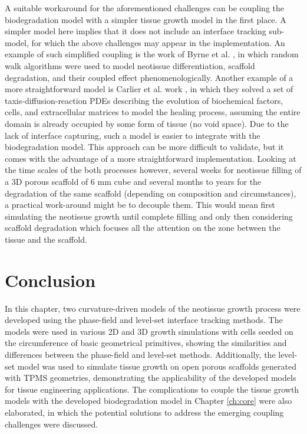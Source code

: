A suitable workaround for the aforementioned challenges can be coupling the biodegradation model with a simpler tissue growth model in the first place. A simpler model here implies that it does not include an interface tracking sub-model, for which the above challenges may appear in the implementation. An example of such simplified coupling is the work of Byrne et al. \cite{Byrne2007}, in which random walk algorithms were used to model neotissue differentiation, scaffold degradation, and their coupled effect phenomenologically. Another example of a more straightforward model is Carlier et al. work \cite{Carlier2012,Carlier2016}, in which they solved a set of taxis-diffusion-reaction {PDE}s describing the evolution of biochemical factors, cells, and extracellular matrices to model the healing process, assuming the entire domain is already occupied by some form of tissue (no void space). Due to the lack of interface capturing, such a model is easier to integrate with the biodegradation model. This approach can be more difficult to validate, but it comes with the advantage of a more straightforward implementation. Looking at the time scales of the both processes however, several weeks for neotissue filling of a 3D porous scaffold of 6 mm cube and several months to years for the degradation of the same scaffold (depending on composition and circumstances), a practical work-around might be to decouple them. This would mean first simulating the neotissue growth until complete filling and only then considering scaffold degradation which focuses all the attention on the zone between the tissue and the scaffold.

\section{Conclusion}

In this chapter, two curvature-driven models of the neotissue growth process were developed using the phase-field and level-set interface tracking methods. The models were used in various 2D and 3D growth simulations with cells seeded on the circumference of basic geometrical primitives, showing the similarities and differences between the phase-field and level-set methods. Additionally, the level-set model was used to simulate tissue growth on open porous scaffolds generated with {TPMS} geometries, demonstrating the applicability of the developed models for tissue engineering applications. The complications to couple the tissue growth models with the developed biodegradation model in Chapter \ref{ch:core} were also elaborated, in which the potential solutions to address the emerging coupling challenges were discussed.



